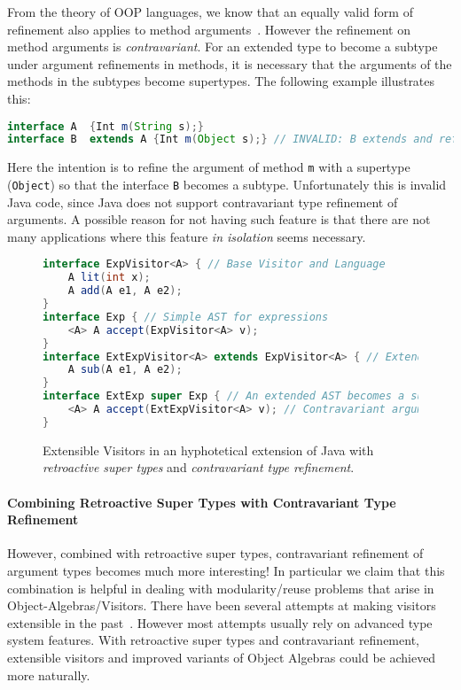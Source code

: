 \noindent From the theory of OOP languages, we know that an equally valid form
of refinement also applies to method arguments~\cite{cardelli1984semantics}.
However the refinement on method arguments is \emph{contravariant}. For an extended
type to become a subtype under argument refinements in methods, it is necessary
that the arguments of the methods in the subtypes become supertypes. The
following example illustrates this:

\begin{lstlisting}[language=java]
interface A  {Int m(String s);} 
interface B  extends A {Int m(Object s);} // INVALID: B extends and refines the return type of m()
\end{lstlisting}

\noindent Here the intention is to refine the argument of method
\lstinline{m} with a supertype (\lstinline{Object}) so that the
interface \lstinline{B} becomes a subtype. Unfortunately this is invalid Java code, since Java
does not support contravariant type refinement of arguments. 
A possible reason for not having such feature is that there are not
many applications where this feature \emph{in isolation} seems necessary. 

\begin{figure}
\begin{lstlisting}[language=java]
interface ExpVisitor<A> { // Base Visitor and Language
	A lit(int x);
	A add(A e1, A e2);
}
interface Exp { // Simple AST for expressions
	<A> A accept(ExpVisitor<A> v);
}
interface ExtExpVisitor<A> extends ExpVisitor<A> { // Extended Visitor and Language
	A sub(A e1, A e2);
}
interface ExtExp super Exp { // An extended AST becomes a supertype of the original one
	<A> A accept(ExtExpVisitor<A> v); // Contravariant argument refinement
}
\end{lstlisting}
\caption{Extensible Visitors in an hyphotetical
  extension of Java with \emph{retroactive super types} and \emph{contravariant
  type refinement}.}
\label{fig:JVis}
\end{figure}

\paragraph{Combining Retroactive Super Types with Contravariant Type Refinement}

However, combined with retroactive super types, contravariant refinement of
argument types becomes much more interesting! In particular we claim that this
combination is helpful in dealing with modularity/reuse problems that arise in
Object-Algebras/Visitors. There have been several attempts at making visitors
extensible in the past~\cite{oliveira09modular,togersen:2004}. However most
attempts usually rely on advanced type system features. With retroactive super
types and contravariant refinement, extensible visitors and improved variants of
Object Algebras could be achieved more naturally.

